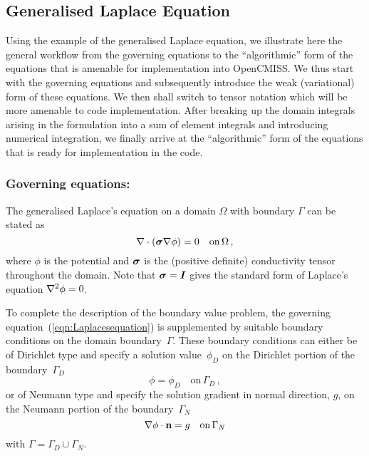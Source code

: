 \subsection{Generalised Laplace Equation}

Using the example of the generalised Laplace equation,
we illustrate here the general workflow from the governing equations
to the ``algorithmic'' form of the equations that is amenable
for implementation into OpenCMISS.
We thus start with the governing equations and subsequently introduce
the weak (variational) form of these equations.
We then shall switch to tensor notation which will be more amenable
to code implementation.
After breaking up the domain integrals arising in the formulation
into a sum of element integrals and introducing numerical integration,
we finally arrive at the ``algorithmic'' form of the equations
that is ready for implementation in the code.


\subsubsection{Governing equations:}
The generalised Laplace's equation on a domain $\Omega$ with boundary $\Gamma$
can be stated as
\begin{equation}
   \nabla\cdot\left( \boldsymbol{\sigma}\nabla \phi \right) =0  \quad \mathrm{on} \, \Omega \,,
  \label{eqn:Laplacesequation}
\end{equation}
where $\phi$ is the potential and $\boldsymbol{\sigma}$ is
the (positive definite) conductivity tensor throughout the domain. Note that 
$\boldsymbol{\sigma}=\boldsymbol{I}$ gives the standard form of Laplace's equation \ie $\nabla^{2} {\phi}=0$.

To complete the description of the boundary value problem,
the governing equation~(\ref{eqn:Laplacesequation}) is supplemented
by suitable boundary conditions on the domain boundary~$\Gamma$.
These boundary conditions can either be of Dirichlet type and specify a solution value~$\phi_D$
on the Dirichlet portion of the boundary~$\Gamma_D$
\begin{equation}
  \phi = \phi_D \quad \mathrm{on} \, \Gamma_D \,,
  \label{eqn:Laplace Dirichlet BC} 
\end{equation}
or of Neumann type and specify the solution gradient in normal direction, $g$,
on the Neumann portion of the boundary~$\Gamma_N$
\begin{equation}
  \nabla \phi \cdot {\bf{n}} = g \quad \mathrm{on} \, \Gamma_N
  \label{eqn:Laplace Dirichlet BC} 
\end{equation}
with $\Gamma = \Gamma_D \cup \Gamma_N$.


